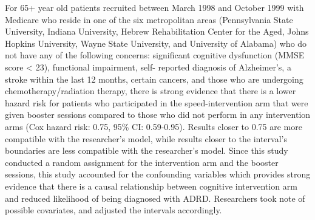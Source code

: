 \documentclass[11pt]{article}
\begin{document}
For 65+ year old patients recruited between March 1998 and October 1999 with Medicare who reside in one of the six metropolitan areas (Pennsylvania State University, Indiana University, Hebrew Rehabilitation Center for the Aged, Johns Hopkins University, Wayne State University, and University of Alabama) who do not have any of the following concerns: significant cognitive dysfunction (MMSE score < 23), functional impairment, self- reported diagnosis of Alzheimer's, a stroke within the last 12 months, certain cancers, and those who are undergoing chemotherapy/radiation therapy, there is strong evidence that there is a lower hazard risk for patients who participated in the speed-intervention arm that were given booster sessions compared to those who did not perform in any intervention arms (Cox hazard risk: 0.75, 95\% CI: 0.59-0.95). Results closer to 0.75 are more compatible with the researcher's model, while results closer to the interval's boundaries are less compatible with the researcher's model. Since this study conducted a random assignment for the intervention arm and the booster sessions, this study accounted for the confounding variables which provides strong evidence that there is a causal relationship between cognitive intervention arm and reduced likelihood of being diagnosed with ADRD. Researchers took note of possible covariates, and adjusted the intervals accordingly.
\end{document}
